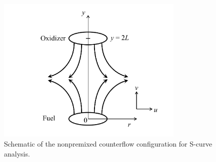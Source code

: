 \begin{figure}[t]
  \centering
  \scriptsize
  \includegraphics[width=0.8\textwidth]{ch-NTC/counterflow.png}
  \normalsize
  \caption{Schematic of the nonpremixed counterflow configuration for S-curve analysis.}
  \label{fig:CF}
\end{figure}

